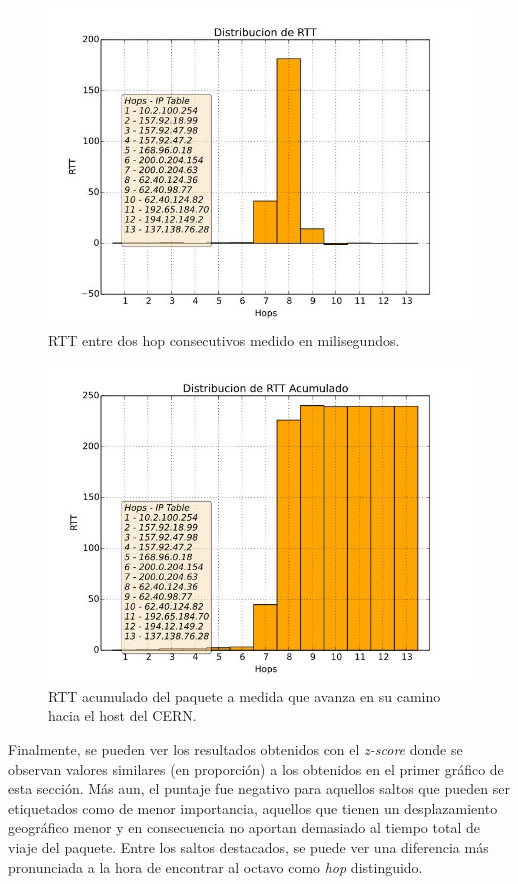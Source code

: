 \begin{figure}[H]
  \centering	
	\includegraphics[scale=0.4]{../cern-experiment/bar_rtt.jpeg}
  \caption{RTT entre dos hop consecutivos medido en milisegundos.}
	\label{fig:histo-src-sitiotrabajo}
\end{figure}

\begin{figure}[H]
  \centering	
	\includegraphics[scale=0.4]{../cern-experiment/bar_rtt_acum.jpeg}
  \caption{RTT acumulado del paquete a medida que avanza en su camino hacia el host del CERN.}
	\label{fig:histo-src-sitiotrabajo}
\end{figure}

Finalmente, se pueden ver los resultados obtenidos con el \textit{z-score} donde se observan valores similares (en proporción) a los obtenidos en el primer gráfico de esta sección. Más aun, el puntaje fue negativo para aquellos saltos que pueden ser etiquetados como de menor importancia, aquellos que tienen un desplazamiento geográfico menor y en consecuencia no aportan demasiado al tiempo total de viaje del paquete. Entre los saltos destacados, se puede ver una diferencia más pronunciada a la hora de encontrar al octavo como \textit{hop} distinguido.

